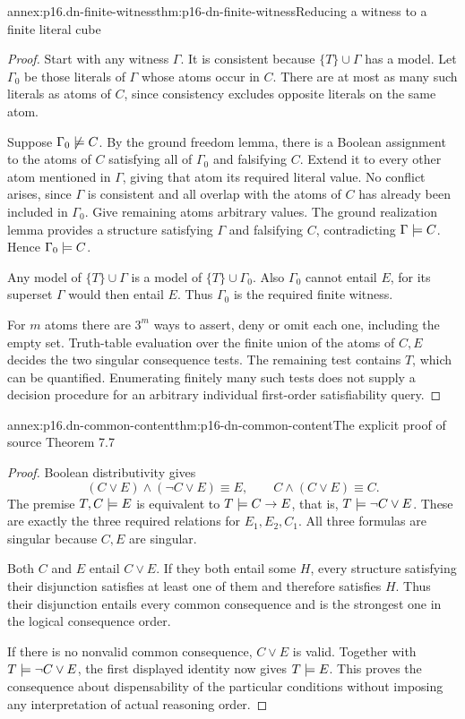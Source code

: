 \begin{annexitem}{annex:p16.dn-finite-witness}{thm:p16-dn-finite-witness}{Reducing a witness to a finite literal cube}
\begin{proof}
Start with any witness \(\Gamma\).
It is consistent because \(\{T\}\cup\Gamma\)
has a model. Let \(\Gamma_0\) be those
literals of \(\Gamma\) whose atoms
occur in \(C\). There are at most
as many such literals as atoms of
\(C\), since consistency excludes
opposite literals on the same atom.

Suppose \(\Gamma_0\not\models C\).
By the ground freedom lemma, there
is a Boolean assignment to the
atoms of \(C\) satisfying all of
\(\Gamma_0\) and falsifying \(C\).
Extend it to every other atom
mentioned in \(\Gamma\), giving
that atom its required literal
value. No conflict arises, since
\(\Gamma\) is consistent and all
overlap with the atoms of \(C\)
has already been included in
\(\Gamma_0\). Give remaining atoms
arbitrary values. The ground
realization lemma provides a
structure satisfying \(\Gamma\)
and falsifying \(C\), contradicting
\(\Gamma\models C\). Hence
\(\Gamma_0\models C\).

Any model of \(\{T\}\cup\Gamma\)
is a model of \(\{T\}\cup\Gamma_0\).
Also \(\Gamma_0\) cannot entail
\(E\), for its superset
\(\Gamma\) would then entail \(E\).
Thus \(\Gamma_0\) is the required
finite witness.

For \(m\) atoms there are \(3^m\)
ways to assert, deny or omit each
one, including the empty set.
Truth-table evaluation over the
finite union of the atoms of
\(C,E\) decides the two singular
consequence tests. The remaining
test contains \(T\), which can
be quantified. Enumerating finitely
many such tests does not supply
a decision procedure for an
arbitrary individual first-order
satisfiability query.
\end{proof}
\end{annexitem}

\begin{annexitem}{annex:p16.dn-common-content}{thm:p16-dn-common-content}{The explicit proof of source Theorem 7.7}
\begin{proof}
Boolean distributivity gives
\[
 (C\lor E)\land(\neg C\lor E)\equiv E,
             \qquad C\land(C\lor E)\equiv C .
\]
The premise \(T,C\models E\)
is equivalent to \(T\models C\to E\),
that is, \(T\models\neg C\lor E\).
These are exactly the three required
relations for \(E_1,E_2,C_1\).
All three formulas are singular
because \(C,E\) are singular.

Both \(C\) and \(E\) entail
\(C\lor E\). If they both entail
some \(H\), every structure satisfying
their disjunction satisfies at
least one of them and therefore
satisfies \(H\). Thus their
disjunction entails every common
consequence and is the strongest
one in the logical consequence
order.

If there is no nonvalid common
consequence, \(C\lor E\) is valid.
Together with
\(T\models\neg C\lor E\),
the first displayed identity now
gives \(T\models E\).
This proves the consequence about
dispensability of the particular
conditions without imposing
any interpretation of actual
reasoning order.
\end{proof}
\end{annexitem}

